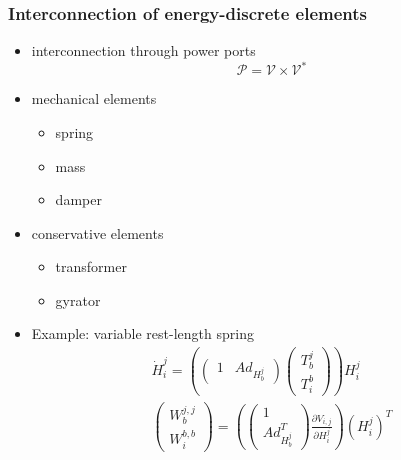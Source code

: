 \documentclass[student]{ITRslides}
\begin{document}
\begin{frame}
	\frametitle{Interconnection of energy-discrete elements}
	\begin{itemize}
			\item interconnection through power ports
		\[ \mathcal{P} = \mathcal{V} \times \mathcal{V}^* \]

		\item mechanical elements
			\begin{itemize}
			\item spring
			\item mass
			\item damper
			\end{itemize}
		\item conservative elements
			\begin{itemize}
			\item transformer
			\item gyrator
			\end{itemize}
		\item Example: variable rest-length spring
		\begin{eqnarray}\label{EQ:variablerestlengthspring}
	\dot{H}_i^j =\left( \begin{pmatrix}1 & Ad_{H_b^j}\end{pmatrix} \begin{pmatrix}T_b^{j} \\ T_i^{b}\end{pmatrix} \right) H_i^j\\
	\begin{pmatrix}W_b^{j,j} \\ W_i^{b,b}\end{pmatrix}  = \left( \begin{pmatrix}1 \\ Ad_{H_b^j}^T\end{pmatrix} \frac{\partial V_{i,j}}{\partial H_i^j} \right) (H_i^j)^T
\end{eqnarray}

\end{itemize}

\end{frame}

%			
%	
%
%		
%		
%			
\end{document}
